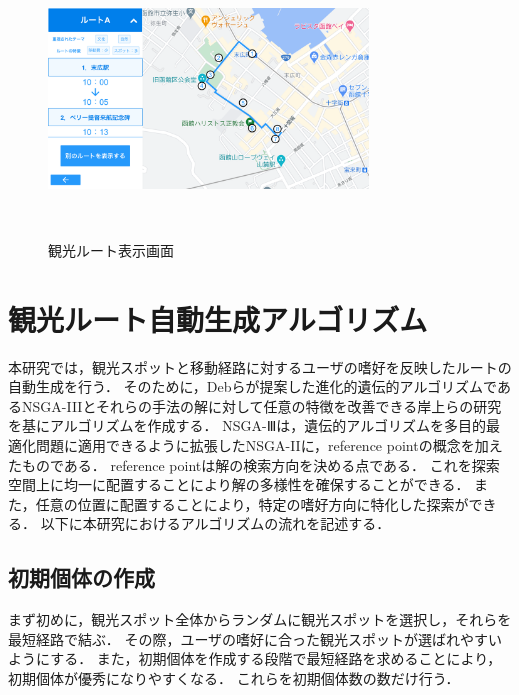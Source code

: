 \begin{figure}[h]
  \begin{center}
  \includegraphics[width=8.5cm,bb=0 0 1980 1080]{sysimage1.png}
  \end{center}
  \caption{観光ルート表示画面}　
  \label{fig:観光ルート表示画面}
\end{figure}
\section{観光ルート自動生成アルゴリズム}\label{sec:観光ルート自動生成アルゴリズム}
本研究では，観光スポットと移動経路に対するユーザの嗜好を反映したルートの自動生成を行う．
そのために，Debらが提案した進化的遺伝的アルゴリズムであるNSGA-I\hspace{-.1em}I\hspace{-.1em}I\cite{NSGA3}とそれらの手法の解に対して任意の特徴を改善できる岸上らの研究\cite{岸上}を基にアルゴリズムを作成する．
NSGA-Ⅲは，遺伝的アルゴリズムを多目的最適化問題に適用できるように拡張したNSGA-I\hspace{-.1em}I\cite{NSGA2}に，reference pointの概念を加えたものである．
reference pointは解の検索方向を決める点である．
これを探索空間上に均一に配置することにより解の多様性を確保することができる．
また，任意の位置に配置することにより，特定の嗜好方向に特化した探索ができる．
以下に本研究におけるアルゴリズムの流れを記述する．
\subsection{初期個体の作成}\label{sec:初期解の作成}
まず初めに，観光スポット全体からランダムに観光スポットを選択し，それらを最短経路で結ぶ．
その際，ユーザの嗜好に合った観光スポットが選ばれやすいようにする．
また，初期個体を作成する段階で最短経路を求めることにより，初期個体が優秀になりやすくなる．
これらを初期個体数の数だけ行う．
